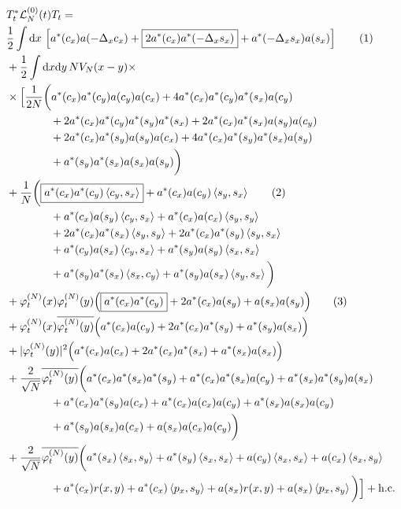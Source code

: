 \documentclass[11pt,a4paper]{scrartcl} %
\newcommand{\di}{\textrm{d}}		%
\newcommand{\Lcal}{\mathcal{L}}		%
\newcommand{\hc}{\mbox{h.c.}}		%
\newcommand{\scal}[2]{\left<#1,#2\right>} %
\newcommand{\cc}[1]{\overline{#1}}	%
\newcommand{\ph}{\varphi_t^{(N)}}	%
\newcommand{\tagg}[1]{ \stepcounter{equation} \tag{\theequation} \label{eq:#1} } %
\begin{document}
\begin{align*}
& T^*_t \Lcal_N^{(0)}(t) T_t = \\ 
& \frac{1}{2} \int \di x\, \left[ a^*(c_x) a(-\Delta_x c_x) + \boxed{2 a^*(c_x) a^*(-\Delta_x s_x)} + a^*(-\Delta_x s_x) a(s_x) \right] \tagg{cancellation_kinetic} \\
& + \frac{1}{2}\int \di x \di y\, NV_N(x-y) \times \\
& \times \Big[   \frac{1}{2N}\bigg( a^*(c_x) a^*(c_y) a(c_y) a(c_x) + 4 a^*(c_x) a^*(c_y) a^*(s_x) a(c_y) \\
				      & \qquad\qquad + 2 a^*(c_x) a^*(c_y) a^*(s_y) a^*(s_x) + 2 a^*(c_x) a^*(s_x) a(s_y) a(c_y) \\
				      & \qquad\qquad + 2 a^*(c_x) a^*(s_y) a(s_y) a(c_x) + 4 a^*(c_x) a^*(s_y) a^*(s_x) a(s_y) \\
				      & \qquad\qquad + a^*(s_y) a^*(s_x) a(s_x) a(s_y) \bigg) \\
& + \frac{1}{N}\bigg(   \boxed{a^*(c_x)a^*(c_y) \scal{c_y}{s_x}} + a^*(c_x) a(c_y) \scal{s_y}{s_x} \tagg{cancellation_normalorder} \\
			& \qquad\qquad + a^*(c_x) a(s_y) \scal{c_y}{s_x} + a^*(c_x) a(c_x) \scal{s_y}{s_y} \\
			& \qquad\qquad + 2 a^*(c_x) a^*(s_x) \scal{s_y}{s_y} + 2a^*(c_x)a^*(s_y) \scal{s_y}{s_x} \\
			& \qquad\qquad + a^*(c_y) a(s_x) \scal{c_y}{s_x} +  a^*(s_y) a(s_y) \scal{s_x}{s_x}\\
			& \qquad\qquad + a^*(s_y) a^*(s_x) \scal{s_x}{c_y} + a^*(s_y) a(s_x) \scal{s_y}{s_x}   \bigg) \\
& + \ph(x)\ph(y) \Big( \boxed{a^*(c_x) a^*(c_y)} + 2 a^*(c_x) a(s_y) +a(s_x) a(s_y) \Big) \tagg{cancellation_standard} \\
& + \ph(x) \cc{\ph(y)} \Big( a^*(c_x) a(c_y) + 2 a^*(c_x) a^*(s_y) + a^*(s_y) a(s_x) \Big) \\
& + \lvert \ph(y) \rvert^2 \Big( a^*(c_x) a(c_x) + 2 a^*(c_x) a^*(s_x) + a^*(s_x) a(s_x) \Big) \\
& + \frac{2}{\sqrt{N}}\cc{\ph(y)} \bigg(    a^*(c_x) a^*(s_x) a^*(s_y) + a^*(c_x) a^*(s_x) a(c_y) + a^*(s_x) a^*(s_y) a(s_x)\\
					    & \qquad\qquad + a^*(c_x) a^*(s_y) a(c_x) + a^*(c_x) a(c_x) a(c_y)+ a^*(s_x) a(s_x) a(c_y) \\
					    & \qquad\qquad + a^*(s_y) a(s_x) a(c_x) + a(s_x) a(c_x) a(c_y)    \bigg) \\
& + \frac{2}{\sqrt{N}}\cc{\ph(y)} \bigg(    a^*(s_x) \scal{s_x}{s_y} + a^*(s_y) \scal{s_x}{s_x}  + a(c_y) \scal{s_x}{s_x} + a(c_x) \scal{s_x}{s_y} \\
					    & \qquad\qquad + a^*(c_x)r(x,y) + a^*(c_x)\scal{p_x}{s_y} + a(s_x)r(x,y) + a(s_x)\scal{p_x}{s_y}		\bigg)    \Big] + \hc
\end{align*}
\end{document}
